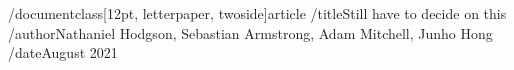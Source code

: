

/documentclass[12pt, letterpaper, twoside]{article}
/title{Still have to decide on this}
/author{Nathaniel Hodgson, Sebastian Armstrong, Adam Mitchell, Junho Hong}
/date{August 2021}
